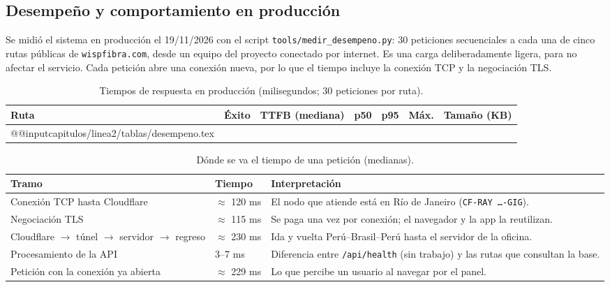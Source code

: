 \subsection{Desempeño y comportamiento en producción}
\label{sec:ce02-e3-desempeno}

Se midió el sistema en producción el 19/11/2026 con el script
\texttt{tools/medir\_desempeno.py}: 30 peticiones secuenciales a cada una de cinco rutas
públicas de \texttt{wispfibra.com}, desde un equipo del proyecto conectado por internet. Es
una carga deliberadamente ligera, para no afectar el servicio. Cada petición abre una
conexión nueva, por lo que el tiempo incluye la conexión TCP y la negociación TLS.

\begin{table}[H]
\centering
\caption{Tiempos de respuesta en producción (milisegundos; 30 peticiones por ruta).}
\label{tab:ce02-e3-desempeno}
\small
\begin{tabularx}{\textwidth}{XC{1.2cm}C{1.4cm}C{1.2cm}C{1.2cm}C{1.2cm}C{1.3cm}}
\toprule
\textbf{Ruta} & \textbf{Éxito} & \textbf{TTFB (mediana)} & \textbf{p50} & \textbf{p95} & \textbf{Máx.} & \textbf{Tamaño (KB)} \\
\midrule
\csname @@input\endcsname capitulos/linea2/tablas/desempeno.tex
\bottomrule
\end{tabularx}
\end{table}

\begin{table}[H]
\centering
\caption{Dónde se va el tiempo de una petición (medianas).}
\label{tab:ce02-e3-latencia}
\small
\begin{tabularx}{\textwidth}{L{5.4cm}C{2cm}X}
\toprule
\textbf{Tramo} & \textbf{Tiempo} & \textbf{Interpretación} \\
\midrule
Conexión TCP hasta Cloudflare & $\approx$ 120 ms & El nodo que atiende está en Río de Janeiro (\texttt{CF-RAY \ldots-GIG}). \\
Negociación TLS & $\approx$ 115 ms & Se paga una vez por conexión; el navegador y la app la reutilizan. \\
Cloudflare $\rightarrow$ túnel $\rightarrow$ servidor $\rightarrow$ regreso & $\approx$ 230 ms & Ida y vuelta Perú--Brasil--Perú hasta el servidor de la oficina. \\
Procesamiento de la API & 3--7 ms & Diferencia entre \texttt{/api/health} (sin trabajo) y las rutas que consultan la base. \\
Petición con la conexión ya abierta & $\approx$ 229 ms & Lo que percibe un usuario al navegar por el panel. \\
\bottomrule
\end{tabularx}
\end{table}

